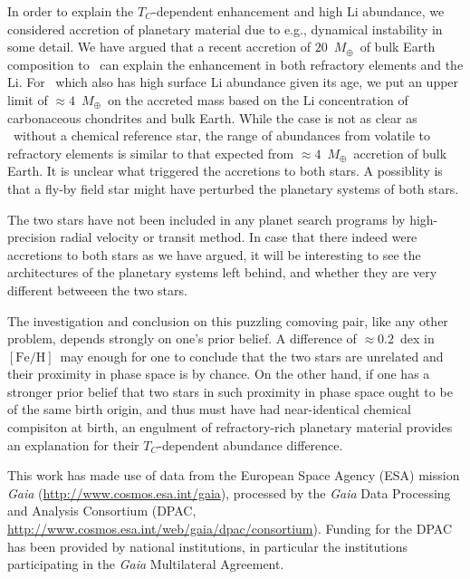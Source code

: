 \documentclass[modern, letterpaper]{aastex61}
\newcommand*\elem[1]{\ensuremath{\mathrm{#1}}}
\newcommand*\elemH[1]{\ensuremath{[\mathrm{#1}/\elem{H}]}}
\newcommand*{\feh}{\ensuremath{\elemH{Fe}}}
\newcommand{\sunanalog}{\text{Krios}}
\newcommand{\bizarreone}{\text{Kronos}}
\newcommand{\Tcondens}{\ensuremath{T_C}}
\newcommand{\mearth}{\ensuremath{M_\oplus}}
\begin{document}
In order to explain the $\Tcondens$-dependent enhancement and high \elem{Li}
abundance, we considered accretion of planetary material due to e.g., dynamical
instability in some detail.
We have argued that a recent accretion of $20$~\mearth\ of bulk Earth
composition to \bizarreone\ can explain the enhancement in both refractory
elements and the \elem{Li}.
For \sunanalog\ which also has high surface \elem{Li} abundance given its age,
we put an upper limit of $\approx 4$~\mearth\ on the accreted mass
based on the \elem{Li} concentration of carbonaceous chondrites and bulk Earth.
While the case is not as clear as \bizarreone\ without a chemical reference star,
the range of abundances from volatile to refractory elements is
similar to that expected from $\approx 4$~\mearth\ accretion of bulk Earth.
It is unclear what triggered the accretions to both stars.
A possiblity is that a fly-by field star might have
perturbed the planetary systems of both stars.

The two stars have not been included in any planet search programs
by high-precision radial velocity or transit method.
In case that there indeed were accretions to both stars as we
have argued, it will be interesting to see the architectures
of the planetary systems left behind, and whether
they are very different betweeen the two stars.

The investigation and conclusion on this puzzling comoving pair, like any other
problem, depends strongly on one's prior belief.
A difference of $\approx 0.2$~dex in \feh\ may enough for one to conclude that
the two stars are unrelated and their proximity in phase space is by chance.
On the other hand, if one has a stronger prior belief that two stars in such
proximity in phase space ought to be of the same birth origin, and thus
must have had near-identical chemical compisiton at birth, an engulment of
refractory-rich planetary material provides an explanation for their
$\Tcondens$-dependent abundance difference.



\acknowledgements

This work has made use of data from the European Space Agency (ESA) mission
{\it Gaia} (\url{http://www.cosmos.esa.int/gaia}), processed by the {\it Gaia}
Data Processing and Analysis Consortium (DPAC,
\url{http://www.cosmos.esa.int/web/gaia/dpac/consortium}). Funding for the DPAC
has been provided by national institutions, in particular the institutions
participating in the {\it Gaia} Multilateral Agreement.



\end{document}
